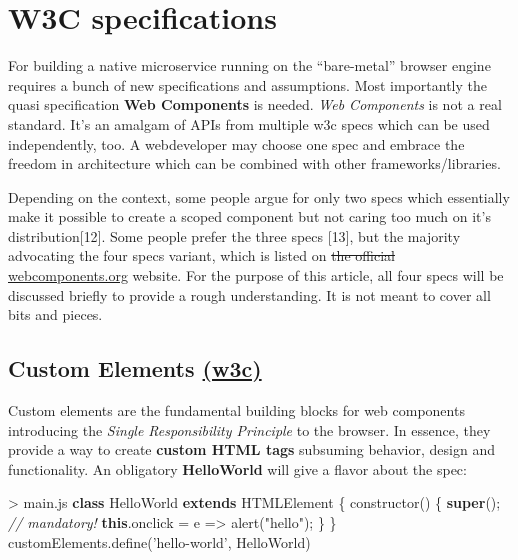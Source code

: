 \documentclass[]{article}
\newenvironment{Shaded}{}{}
\newcommand{\KeywordTok}[1]{\textcolor[rgb]{0.00,0.44,0.13}{\textbf{{#1}}}}
\newcommand{\StringTok}[1]{\textcolor[rgb]{0.25,0.44,0.63}{{#1}}}
\newcommand{\CommentTok}[1]{\textcolor[rgb]{0.38,0.63,0.69}{\textit{{#1}}}}
\newcommand{\VariableTok}[1]{\textcolor[rgb]{0.10,0.09,0.49}{{#1}}}
\newcommand{\OperatorTok}[1]{\textcolor[rgb]{0.40,0.40,0.40}{{#1}}}
\newcommand{\AttributeTok}[1]{\textcolor[rgb]{0.49,0.56,0.16}{{#1}}}
\newcommand{\NormalTok}[1]{{#1}}
\begin{document}
\section{W3C specifications}\label{w3c-specifications}

For building a native microservice running on the ``bare-metal'' browser
engine requires a bunch of new specifications and assumptions. Most
importantly the quasi specification \textbf{Web Components} is needed.
\emph{Web Components} is not a real standard. It's an amalgam of APIs
from multiple w3c specs which can be used independently, too. A
webdeveloper may choose one spec and embrace the freedom in architecture
which can be combined with other frameworks/libraries.

Depending on the context, some people argue for only two specs which
essentially make it possible to create a scoped component but not caring
too much on it's distribution{[}12{]}. Some people prefer the three
specs {[}13{]}, but the majority advocating the four specs variant,
which is listed on \sout{the official}
\href{http://webcomponents.org}{webcomponents.org} website. For the
purpose of this article, all four specs will be discussed briefly to
provide a rough understanding. It is not meant to cover all bits and
pieces.

\subsection{\texorpdfstring{Custom Elements
\href{http://w3c.github.io/webcomponents/spec/custom/}{(w3c)}}{Custom Elements (w3c)}}\label{custom-elements-w3c}

Custom elements are the fundamental building blocks for web components
introducing the \emph{Single Responsibility Principle} to the browser.
In essence, they provide a way to create \textbf{custom HTML tags}
subsuming behavior, design and functionality. An obligatory
\textbf{HelloWorld} will give a flavor about the spec:

\begin{Shaded}
\begin{Highlighting}[]
\OperatorTok{>} \VariableTok{main}\NormalTok{.}\AttributeTok{js}
\KeywordTok{class} \NormalTok{HelloWorld }\KeywordTok{extends} \NormalTok{HTMLElement }\OperatorTok{\{}
 \AttributeTok{constructor}\NormalTok{() }\OperatorTok{\{}
  \KeywordTok{super}\NormalTok{()}\OperatorTok{;} \CommentTok{// mandatory!}
  \KeywordTok{this}\NormalTok{.}\AttributeTok{onclick} \OperatorTok{=} \NormalTok{e }\OperatorTok{=>} \AttributeTok{alert}\NormalTok{(}\StringTok{"hello"}\NormalTok{)}\OperatorTok{;}
 \OperatorTok{\}}
\OperatorTok{\}}
\VariableTok{customElements}\NormalTok{.}\AttributeTok{define}\NormalTok{(}\StringTok{'hello-world'}\OperatorTok{,} \NormalTok{HelloWorld)}
\end{Highlighting}
\end{Shaded}
\end{document}
